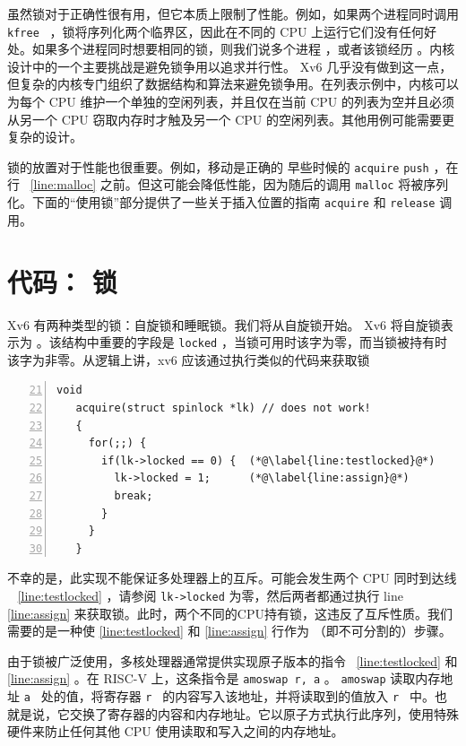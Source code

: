 \documentclass[UTF8]{article}
\begin{document}
虽然锁对于正确性很有用，但它本质上限制了性能。例如，如果两个进程同时调用  {    \tt    kfree   } ，锁将序列化两个临界区，因此在不同的 CPU 上运行它们没有任何好处。如果多个进程同时想要相同的锁，则我们说多个进程        ，或者该锁经历        。内核设计中的一个主要挑战是避免锁争用以追求并行性。 Xv6 几乎没有做到这一点，但复杂的内核专门组织了数据结构和算法来避免锁争用。在列表示例中，内核可以为每个 CPU 维护一个单独的空闲列表，并且仅在当前 CPU 的列表为空并且必须从另一个 CPU 窃取内存时才触及另一个 CPU 的空闲列表。其他用例可能需要更复杂的设计。  

锁的放置对于性能也很重要。例如，移动是正确的
 早些时候的    \lstinline{acquire}   
    \lstinline{push}    ，在行~    \ref{line:malloc}    之前。但这可能会降低性能，因为随后的调用
    \lstinline{malloc}    将被序列化。下面的“使用锁”部分提供了一些关于插入位置的指南
    \lstinline{acquire}    和
    \lstinline{release}    调用。
    \section{代码： 锁  }    Xv6 有两种类型的锁：自旋锁和睡眠锁。我们将从自旋锁开始。 Xv6 将自旋锁表示为
        。该结构中重要的字段是
    \lstinline{locked}    ，当锁可用时该字为零，而当锁被持有时该字为非零。从逻辑上讲，xv6 应该通过执行类似的代码来获取锁
    \begin{lstlisting}[numbers=left,firstnumber=21]
   void
   acquire(struct spinlock *lk) // does not work!
   {
     for(;;) {
       if(lk->locked == 0) {  (*@\label{line:testlocked}@*)
         lk->locked = 1;      (*@\label{line:assign}@*)
         break;
       }
     }
   }
\end{lstlisting}    不幸的是，此实现不能保证多处理器上的互斥。可能会发生两个 CPU 同时到达线 ~    \ref{line:testlocked}    ，请参阅
    \lstinline{lk->locked}    为零，然后两者都通过执行 line~    \ref{line:assign}    来获取锁。此时，两个不同的CPU持有锁，这违反了互斥性质。我们需要的是一种使    \ref{line:testlocked}    和    \ref{line:assign}    行作为
       （即不可分割的）步骤。  

由于锁被广泛使用，多核处理器通常提供实现原子版本的指令~    \ref{line:testlocked}    和    \ref{line:assign}    。在 RISC-V 上，这条指令是
    \lstinline{amoswap r, a}    。
    \lstinline{amoswap}    读取内存地址  {    \tt    a   }  处的值，将寄存器  {    \tt    r   }  的内容写入该地址，并将读取到的值放入  {    \tt    r   }  中。也就是说，它交换了寄存器的内容和内存地址。它以原子方式执行此序列，使用特殊硬件来防止任何其他 CPU 使用读取和写入之间的内存地址。  
\end{document}
